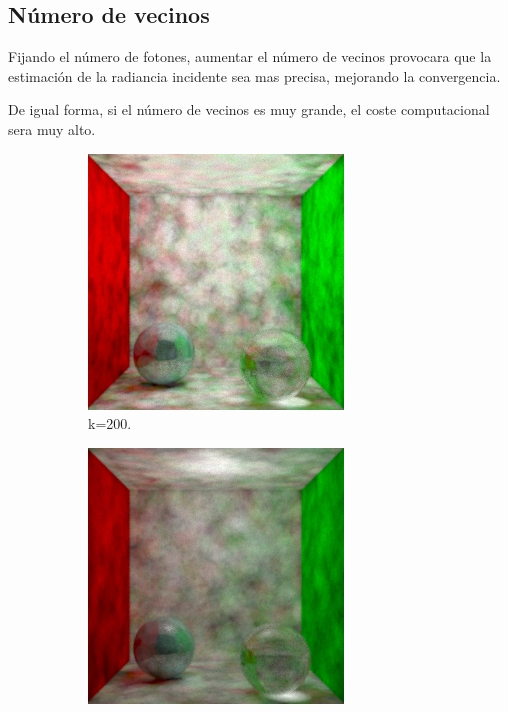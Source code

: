 \documentclass{article}
\begin{document}
\subsection{Número de vecinos}
Fijando el número de fotones, aumentar el número de vecinos provocara que la estimación de la radiancia incidente sea mas precisa, mejorando la convergencia. 

De igual forma, si el número de vecinos es muy grande, el coste computacional sera muy alto. 

\begin{figure}
\begin{subfigure}[h]{0.32\linewidth}
\includegraphics[width=\linewidth]{imgs/100k200k.png}
\caption{k=200.}
\end{subfigure}
\hfill
\begin{subfigure}[h]{0.32\linewidth}
\includegraphics[width=\linewidth]{imgs/100k1000k.png}

\end{subfigure}
\end{figure}
\end{document}
